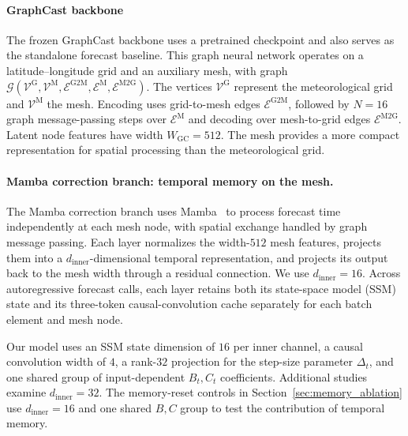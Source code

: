 \documentclass[11pt]{article}
\begin{document}
\paragraph{{GraphCast backbone}}
{The frozen GraphCast backbone uses a pretrained checkpoint and also serves as the standalone forecast baseline.} This graph neural network operates on a latitude--longitude grid and an auxiliary mesh, with graph $\mathcal{G}(\mathcal{V}^{\textrm{G}},\mathcal{V}^{\textrm{M}},\mathcal{E}^{\textrm{G2M}},\mathcal{E}^{\textrm{M}},\mathcal{E}^{\textrm{M2G}})$. The vertices $\mathcal{V}^{\textrm{G}}$ represent the meteorological grid and $\mathcal{V}^{\textrm{M}}$ the mesh. Encoding uses grid-to-mesh edges $\mathcal{E}^{\textrm{G2M}}$, followed by $N=16$ graph message-passing steps over $\mathcal{E}^{\textrm{M}}$ and decoding over mesh-to-grid edges $\mathcal{E}^{\textrm{M2G}}$. Latent node features have width $W_{\textrm{GC}}=512$. The mesh provides a more compact representation for spatial processing than the meteorological grid.

\paragraph{{Mamba correction branch: temporal memory on the mesh.}}
The Mamba correction branch uses Mamba~\citep{gu2023mamba} to process forecast time independently at each mesh node, with spatial exchange handled by graph message passing. Each layer normalizes the width-$512$ mesh features, projects them into a $d_{\mathrm{inner}}$-dimensional temporal representation, and projects its output back to the mesh width through a residual connection. We use $d_{\mathrm{inner}}=16$. Across autoregressive forecast calls, each layer retains both its {state-space model (SSM) state} and its three-token causal-convolution cache separately for each batch element and mesh node.

Our model uses an SSM state dimension of $16$ per inner channel, a causal convolution width of $4$, a rank-$32$ projection for the step-size parameter $\Delta_t$, and one shared group of input-dependent $B_t,C_t$ coefficients. Additional studies examine $d_{\mathrm{inner}}=32$. The memory-reset controls in Section~\ref{sec:memory_ablation} use $d_{\mathrm{inner}}=16$ and one shared $B,C$ group to test the contribution of temporal memory.
\end{document}
